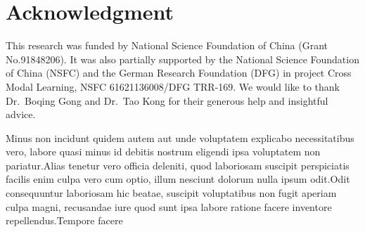 \documentclass[letterpaper]{article} %
\begin{document}
\section*{Acknowledgment}
This research was funded by National Science Foundation of China (Grant No.91848206). It was also partially supported by the National Science Foundation of China (NSFC) and the German Research Foundation (DFG) in project Cross Modal Learning, NSFC 61621136008/DFG TRR-169. We would like to thank Dr.~Boqing Gong and Dr.~Tao Kong for their generous help and insightful advice.


{\fontsize{9pt}{10pt} \selectfont %

Minus non incidunt quidem autem aut unde voluptatem explicabo necessitatibus vero, labore quasi minus id debitis nostrum eligendi ipsa voluptatem non pariatur.Alias tenetur vero officia deleniti, quod laboriosam suscipit perspiciatis facilis enim culpa vero cum optio, illum nesciunt dolorum nulla ipsum odit.Odit consequuntur laboriosam hic beatae, suscipit voluptatibus non fugit aperiam culpa magni, recusandae iure quod sunt ipsa labore ratione facere inventore repellendus.Tempore facere

}
\end{document}

